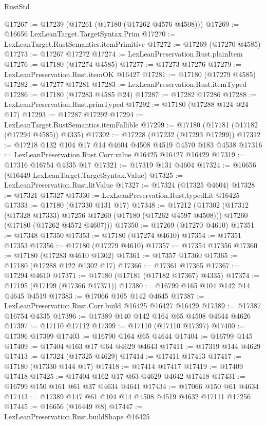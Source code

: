 \begin{lexlean}{RustStd}
\begin{coremodule}
@17267 := @17239 (@17261 (@17180 (@17262 @4576 @4508)))
@17269 := @16656 LexLeanTarget.TargetSyntax.Prim
@17270 := LexLeanTarget.RustSemantics.itemPrimitive
@17272 := @17269 (@17270 @4585)
@17273 := @17267 @17272
@17274 := LexLeanPreservation.Rust.plainItem
@17276 := @17180 (@17274 @4585)
@17277 := @17273 @17276
@17279 := LexLeanPreservation.Rust.itemOK @16427
@17281 := @17180 (@17279 @4585)
@17282 := @17277 @17281
@17283 := LexLeanPreservation.Rust.itemTyped
@17286 := @17180 (@17283 @4585 @24)
@17287 := @17282 @17286
@17288 := LexLeanPreservation.Rust.primTyped
@17292 := @17180 (@17288 @124 @24 @17)
@17293 := @17287 @17292
@17294 := LexLeanTarget.RustSemantics.itemFallible
@17299 := @17180 (@17181 (@17182 (@17294 @4585)) @4335)
@17302 := @17228 (@17232 (@17293 @17299))
@17312 := @17218 @132 @104 @17 @14 @4604 @4508 @4519 @4570 @183 @4538
@17316 := LexLeanPreservation.Rust.Corr.value @16425 @16427 @16429
@17319 := @17316 @16754 @4335 @17
@17321 := @17319 @131 @4604
@17324 := @16656 (@16449 LexLeanTarget.TargetSyntax.Value)
@17325 := LexLeanPreservation.Rust.litValue
@17327 := @17324 (@17325 @4604)
@17328 := @17321 @17327
@17330 := LexLeanPreservation.Rust.typedLit @16425
@17333 := @17180 (@17330 @131 @17)
@17348 := @17212
    (@17302
      (@17312 (@17328 @17333) @17256 @17260 (@17180 (@17262 @4597 @4508)))
      @17260
      (@17180 (@17262 @4572 @4607)))
@17350 := @17269 (@17270 @4610)
@17351 := @17348 @17350
@17353 := @17180 (@17274 @4610)
@17354 := @17351 @17353
@17356 := @17180 (@17279 @4610)
@17357 := @17354 @17356
@17360 := @17180 (@17283 @4610 @1302)
@17361 := @17357 @17360
@17365 := @17180 (@17288 @122 @1302 @17)
@17366 := @17361 @17365
@17367 := @17294 @4610
@17371 := @17180 (@17181 (@17182 @17367) @4335)
@17374 := @17195 (@17199 (@17366 @17371))
@17380 := @16799 @165 @104 @142 @14 @4645 @4519
@17383 := @17066 @165 @142 @4645
@17387 := LexLeanPreservation.Rust.Corr.build @16425 @16427 @16429
@17389 := @17387 @16754 @4335
@17396 := @17389 @140 @142 @164 @65 @4508 @4644 @4626
@17397 := @17110 @17112
@17399 := @17110 (@17110 @17397)
@17400 := @17396 @17399
@17403 := @16790 @164 @65 @4644
@17404 := @16799 @145
@17409 := @17404 @163 @17 @64 @4629 @4643
@17411 := @17319 @144 @4629
@17413 := @17324 (@17325 @4629)
@17414 := @17411 @17413
@17417 := @17180 (@17330 @144 @17)
@17418 := @17414 @17417
@17419 := @17409 @17418
@17425 := @17404 @162 @17 @63 @4629 @4642 @17418
@17431 := @16799 @150 @161 @61 @37 @4634 @4641
@17434 := @17066 @150 @61 @4634
@17443 := @17389 @147 @61 @104 @14 @4508 @4519 @4632 @17111 @17256
@17445 := @16656 (@16449 @8)
@17447 := LexLeanPreservation.Rust.buildShape @16425

\end{coremodule}
\end{lexlean}
